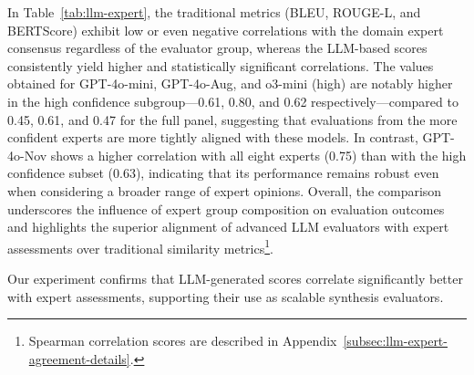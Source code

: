 In Table~\ref{tab:llm-expert}, the traditional metrics (BLEU, ROUGE-L, and BERTScore) exhibit low or even negative correlations with the domain expert consensus regardless of the evaluator group, whereas the LLM-based scores consistently yield higher and statistically significant correlations. The values obtained for GPT-4o-mini, GPT-4o-Aug, and o3-mini (high) are notably higher in the high confidence subgroup—0.61, 0.80, and 0.62 respectively—compared to 0.45, 0.61, and 0.47 for the full panel, suggesting that evaluations from the more confident experts are more tightly aligned with these models. In contrast, GPT-4o-Nov shows a higher correlation with all eight experts (0.75) than with the high confidence subset (0.63), indicating that its performance remains robust even when considering a broader range of expert opinions. Overall, the comparison underscores the influence of expert group composition on evaluation outcomes and highlights the superior alignment of advanced LLM evaluators with expert assessments over traditional similarity metrics\footnote{Spearman correlation scores are described in Appendix~\ref{subsec:llm-expert-agreement-details}.}.

Our experiment confirms that LLM-generated scores correlate significantly better with expert assessments, supporting their use as scalable synthesis evaluators.




